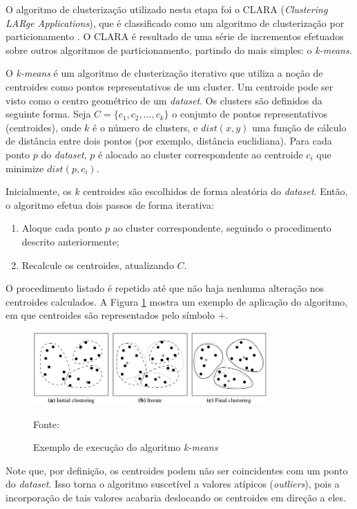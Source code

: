 O algoritmo de clusterização utilizado nesta etapa foi o CLARA (\textit{Clustering LARge Applications}), que é classificado como um algoritmo de clusterização por particionamento \cite{han2005}. O CLARA é resultado de uma série de incrementos efetuados sobre outros algoritmos de particionamento, partindo do mais simples: o \textit{k-means}.

O \textit{k-means} é um algoritmo de clusterização iterativo que utiliza a noção de centroides como pontos representativos de um cluster. Um centroide pode ser visto como o centro geométrico de um \textit{dataset}. Os clusters são definidos da seguinte forma. Seja $C=\{c_1,c_2,...,c_k\}$ o conjunto de pontos representativos (centroides), onde $k$ é o número de clusters, e $dist(x,y)$ uma função de cálculo de distância entre dois pontos (por exemplo, distância euclidiana). Para cada ponto $p$ do \textit{dataset}, $p$ é alocado ao cluster correspondente ao centroide $c_i$ que minimize $dist(p,c_i)$. 

Inicialmente, os $k$ centroides são escolhidos de forma aleatória do \textit{dataset}. Então, o algoritmo efetua dois passos de forma iterativa:
\begin{enumerate}
	\item Aloque cada ponto $p$ ao cluster correspondente, seguindo o procedimento descrito anteriormente;
	\item Recalcule os centroides, atualizando $C$.
\end{enumerate}

O procedimento listado é repetido até que não haja nenhuma alteração nos centroides calculados. A Figura \ref{fig:kmeans} mostra um exemplo de aplicação do algoritmo, em que centroides são representados pelo símbolo $+$. 

\begin{figure}[h]
	\centering
	\caption{Exemplo de execução do algoritmo \textit{k-means}}
  \includegraphics[width=0.8\textwidth]{imagens/kmeans.png}
  \label{fig:kmeans}  
  
  Fonte: \cite{han2005}
\end{figure}

Note que, por definição, os centroides podem não ser coincidentes com um ponto do \textit{dataset}. Isso torna o algoritmo suscetível a valores atípicos (\textit{outliers}), pois a incorporação de tais valores acabaria deslocando os centroides em direção a eles.

